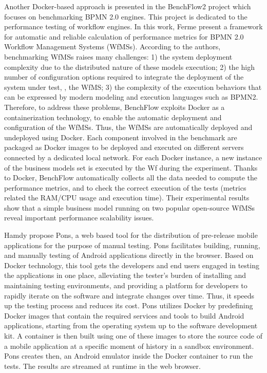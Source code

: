 Another Docker-based approach is presented in the BenchFlow2 project which focuses on benchmarking BPMN 2.0 engines\cite{ferme2015framework}. This project is dedicated to the performance testing of workflow engines. In this work, Ferme \etal present a framework for automatic and reliable calculation of performance metrics for BPMN 2.0 Workflow Management Systems (WfMSs). 
According to the authors, benchmarking WfMSs raises many challenges: 1) the system deployment complexity due to the distributed nature of these models execution; 2) the high number of configuration options required to integrate the deployment of the system under test, \ie, the WfMS; 3) the complexity of the execution behaviors that can be expressed by modern modeling and execution languages such as BPMN2.
Therefore, to address these problems, BenchFlow exploits Docker as a containerization technology, to enable the automatic deployment and configuration of the WfMSs.
Thus, the WfMSs are automatically deployed and undeployed using Docker. Each component involved in the benchmark are packaged as Docker images
to be deployed and executed on different servers connected by a dedicated local
network. For each Docker instance, a new instance of the business models set is executed by the Wf during the experiment.
Thanks to Docker, BenchFlow automatically collects all the data needed to compute the performance metrics, and to check the correct execution of the tests (metrics related the RAM/CPU usage and execution time).
Their experimental results show that a simple business model running on two popular
open-source WfMSs reveal important performance scalability issues. 

Hamdy \etal\cite{hamdy2016web} propose Pons, a web based tool for the distribution of pre-release mobile
applications for the purpose of manual testing. Pons facilitates building, running, and manually testing of Android applications directly in the browser. 
Based on Docker technology, this tool gets the developers and end users engaged in testing the applications in one
place, alleviating the tester's burden of installing and maintaining testing environments, and providing a platform for developers to rapidly iterate on the software and integrate changes over time. Thus, it speeds up the testing process and reduces its cost.
Pons utilizes Docker by predefining Docker images that
contain the required services and tools to build Android applications, starting from the operating system up to the
software development kit. A container is then built using one of these images to store the source code of
a mobile application at a specific moment of history in a
sandbox environment. Pons creates then, an Android emulator inside the Docker container to run the tests. The results are streamed at runtime in the web browser.

